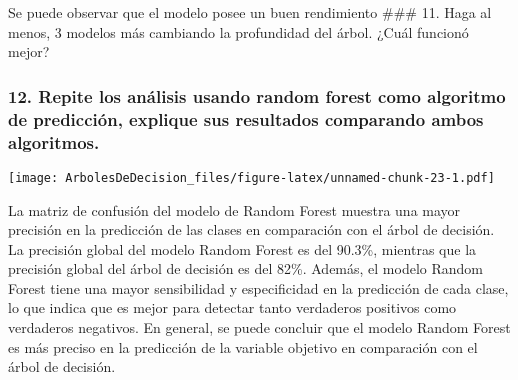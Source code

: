 \documentclass[
]{article}
\newenvironment{Shaded}{\begin{snugshade}}{\end{snugshade}}
\newcommand{\FunctionTok}[1]{\textcolor[rgb]{0.00,0.00,0.00}{#1}}
\newcommand{\NormalTok}[1]{#1}
\newcommand{\OtherTok}[1]{\textcolor[rgb]{0.56,0.35,0.01}{#1}}
\newcommand{\SpecialCharTok}[1]{\textcolor[rgb]{0.00,0.00,0.00}{#1}}
\begin{document}
Se puede observar que el modelo posee un buen rendimiento \#\#\# 11.
Haga al menos, 3 modelos más cambiando la profundidad del árbol. ¿Cuál
funcionó mejor?

\hypertarget{repite-los-anuxe1lisis-usando-random-forest-como-algoritmo-de-predicciuxf3n-explique-sus-resultados-comparando-ambos-algoritmos.}{%
\subsubsection{12. Repite los análisis usando random forest como
algoritmo de predicción, explique sus resultados comparando ambos
algoritmos.}\label{repite-los-anuxe1lisis-usando-random-forest-como-algoritmo-de-predicciuxf3n-explique-sus-resultados-comparando-ambos-algoritmos.}}

\begin{Shaded}
\end{Shaded}

\texttt{[image: ArbolesDeDecision\_files/figure-latex/unnamed-chunk-23-1.pdf]}

La matriz de confusión del modelo de Random Forest muestra una mayor
precisión en la predicción de las clases en comparación con el árbol de
decisión. La precisión global del modelo Random Forest es del 90.3\%,
mientras que la precisión global del árbol de decisión es del 82\%.
Además, el modelo Random Forest tiene una mayor sensibilidad y
especificidad en la predicción de cada clase, lo que indica que es mejor
para detectar tanto verdaderos positivos como verdaderos negativos. En
general, se puede concluir que el modelo Random Forest es más preciso en
la predicción de la variable objetivo en comparación con el árbol de
decisión.
\end{document}
